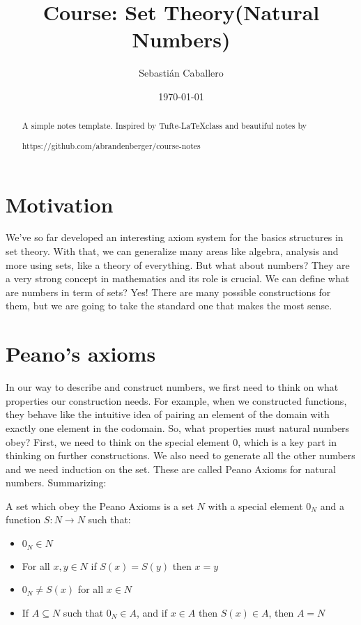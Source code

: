 \documentclass{tufte-handout}
\title{Course:  Set Theory(Natural Numbers)}
\author{Sebastián Caballero}
\date{\today}
\begin{document}
\maketitle

\begin{abstract}
\noindent
A simple notes template. Inspired by Tufte-\LaTeX class and beautiful notes by \begin{verbatim*}
	https://github.com/abrandenberger/course-notes
\end{verbatim*}
\end{abstract}
\section{Motivation}
We've so far developed an interesting axiom system for the basics structures in set theory. With that, we can generalize many areas like algebra, analysis and more using sets, like a theory of everything. But what about numbers? They are a very strong concept in mathematics and its role is crucial. We can define what are numbers in term of sets? Yes! There are many possible constructions for them, but we are going to take the standard one that makes the most sense.\\

\section{Peano's axioms}
In our way to describe and construct numbers, we first need to think on what properties our construction needs. For example, when we constructed functions, they behave like the intuitive idea of pairing an element of the domain with exactly one element in the codomain. So, what properties must natural numbers obey? First, we need to think on the special element $0$, which is a key part in thinking on further constructions. We also need to generate all the other numbers and we need induction on the set. These are called Peano Axioms for natural numbers. Summarizing:

\begin{axiom}
	A set which obey the Peano Axioms is a set $N$ with a special element $0_N$ and a function $S: N \to N$ such that:
	\begin{itemize}
		\item $0_N \in N$
		\item For all $x, y \in N$ if $S(x) = S(y)$ then $x = y$
		\item $0_N \neq S(x)$ for all $x \in N$
		\item If $A \subseteq N$ such that $0_N \in A$, and if $x \in A$ then $S(x) \in A$, then $A = N$
	\end{itemize}
\end{axiom}
\end{document}
